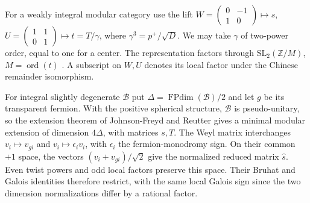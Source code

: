 \documentclass[11pt,a4paper]{article}
\numberwithin{equation}{section}
\theoremstyle{remark}
\newcommand{\FPdim}{\operatorname{FPdim}}
\DeclareMathOperator{\ord}{ord}
\begin{document}
For a weakly integral modular category use the lift
$W=\left(\begin{smallmatrix}0&-1\\1&0\end{smallmatrix}\right)\mapsto s$,
$U=\left(\begin{smallmatrix}1&1\\0&1\end{smallmatrix}\right)\mapsto t=T/\gamma$,
where $\gamma^3=p^+/\sqrt D$. We may take $\gamma$ of two-power order, equal to one for a center. The representation factors through $\mathrm{SL}_2(\mathbb Z/M)$, $M=\ord(t)$ \cite[(1-10), Theorem~II(i), Proposition~6.7(ii) and Theorem~6.10]{DLNCongruence}. A subscript on $W,U$ denotes its local factor under the Chinese remainder isomorphism.

For integral slightly degenerate $\mathcal B$ put $\Delta=\FPdim(\mathcal B)/2$ and let $g$ be its transparent fermion. With the positive spherical structure, $\mathcal B$ is pseudo-unitary, so the extension theorem of Johnson-Freyd and Reutter \cite[Corollary~1.3]{JFR} gives a minimal modular extension of dimension $4\Delta$, with matrices $s,T$. The Weyl matrix interchanges $v_i\mapsto v_{gi}$ and $v_i\mapsto\epsilon_i v_i$, with $\epsilon_i$ the fermion-monodromy sign. On their common $+1$ space, the vectors $(v_i+v_{gi})/\sqrt2$ give the normalized reduced matrix $\widehat s$. Even twist powers and odd local factors preserve this space. Their Bruhat and Galois identities therefore restrict, with the same local Galois sign since the two dimension normalizations differ by a rational factor.
\end{document}
